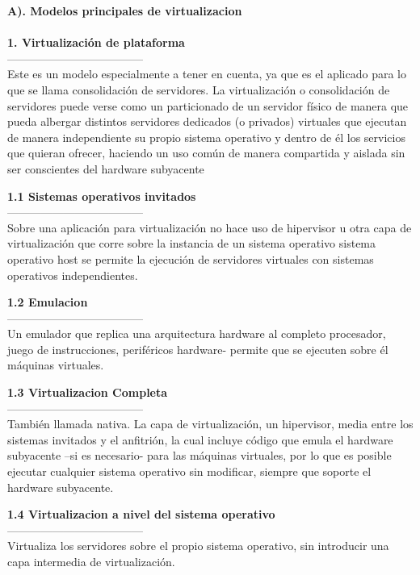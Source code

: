 \documentclass[twoside,twocolumn]{article}
\begin{document}
\begin{flushright}
\begin{itemize}
 \textbf{A). Modelos principales de virtualizacion }\\

\textbf{}\\
 \textbf{1.  Virtualización de plataforma }\\
------------------------------------
\textbf{}\\
 Este es un modelo especialmente a tener en cuenta, ya que es el aplicado para lo que se llama consolidación de servidores. La virtualización o consolidación de servidores puede verse como un particionado de un servidor físico de manera que pueda albergar distintos servidores dedicados (o privados) virtuales que ejecutan de manera independiente su propio sistema operativo y dentro de él los servicios que quieran ofrecer, haciendo un uso común de manera compartida y aislada sin ser conscientes del hardware subyacente

 \textbf{1.1  Sistemas operativos invitados }\\
------------------------------------
\textbf{}\\
Sobre una aplicación para virtualización no
hace uso de hipervisor u otra capa de virtualización que corre sobre la instancia
de un sistema operativo sistema operativo host se permite la ejecución de
servidores virtuales con sistemas operativos independientes.

 \textbf{1.2  Emulacion }\\
------------------------------------
\textbf{}\\
Un emulador que replica una arquitectura hardware al completo
procesador, juego de instrucciones, periféricos hardware- permite que se
ejecuten sobre él máquinas virtuales.

\textbf{1.3  Virtualizacion Completa }\\
------------------------------------
\textbf{}\\ 
También llamada nativa. La capa de virtualización, un
hipervisor, media entre los sistemas invitados y el anfitrión, la cual incluye
código que emula el hardware subyacente –si es necesario- para las máquinas
virtuales, por lo que es posible ejecutar cualquier sistema operativo sin
modificar, siempre que soporte el hardware subyacente.

\textbf{1.4  Virtualizacion a nivel del sistema operativo }\\
------------------------------------
\textbf{}\\
Virtualiza los servidores sobre el
propio sistema operativo, sin introducir una capa intermedia de virtualización.


\end{itemize}
\end{flushright}
\end{document}
